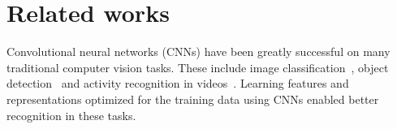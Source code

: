 \documentclass[letterpaper, 10 pt, conference]{ieeeconf}
\begin{document}









\section{Related works}
Convolutional neural networks (CNNs) have been greatly successful on many traditional computer vision tasks. These include image classification~\cite{krizhevsky2012imagenet,simonyan2014very}, object detection~\cite{girshick2015fast,liu2016ssd} and activity recognition in videos~\cite{carreira2017quo,piergiovanni2018learning}. Learning features and representations optimized for the training data using CNNs enabled better recognition in these tasks.
\end{document}
